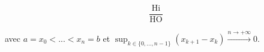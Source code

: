 \documentclass[a4paper,12pt]{article}
\begin{document}
	\begin{equation}
		\frac{\textrm{Hi}}{\textrm{HO}}
	\end{equation}	
	
	avec $a = x_0 < ... < x_n = b$ et $\sup_{k \in \{0,...,  n-1\}}( x_{k+1}-x_{k}) \overset{n \rightarrow + \infty}{\longrightarrow} 0$.

\newpage
\fancyhead[L]{}


\end{document}
